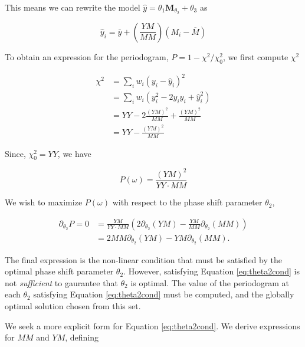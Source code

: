 \documentclass[apj]{emulateapj}
\newcommand{\Mshft}{\mathbf{M}_{\theta_2}}
\newcommand{\Mbar}{\overline{M}}
\begin{document}
This means we can rewrite the model $\hat{y} = \theta_1\Mshft + \theta_3$ as 

\begin{equation}
\hat{y}_i = \bar{y} + \left(\frac{YM}{MM}\right)(M_i - \Mbar)
\end{equation}

To obtain an expression for the periodogram, $P = 1 - \chi^2 / \chi^2_0$, we first compute $\chi^2$

\begin{align}
\chi^2 &= \sum_i w_i (y_i - \hat{y}_i)^2 \\
       &= \sum_i w_i (y_i^2 - 2y_i\hat{y}_i + \hat{y}_i^2)\\
       &= YY - 2\frac{(YM)^2}{MM} + \frac{(YM)^2}{MM}\\
       &= YY - \frac{(YM)^2}{MM}
\end{align}

Since, $\chi^2_0 = YY$, we have

\begin{equation}
P(\omega) = \frac{(YM)^2}{YY\cdot MM}
\end{equation}

We wish to maximize $P(\omega)$ with respect to the phase shift parameter $\theta_2$,

\begin{align}
\label{eq:theta2cond}
\partial_{\theta_2}P = 0 &= \frac{YM}{YY\cdot MM}\left(2\partial_{\theta_2}(YM) - \frac{YM}{MM}\partial_{\theta_2}(MM)\right)\\
                         &= 2MM\partial_{\theta_2}(YM) - YM\partial_{\theta_2}(MM).
\end{align}

The final expression is the non-linear condition that must be satisfied by the optimal
phase shift parameter $\theta_2$. However, satisfying Equation \ref{eq:theta2cond}
is not \emph{sufficient} to gaurantee that $\theta_2$ is optimal. The value of the
periodogram at each $\theta_2$ satisfying Equation \ref{eq:theta2cond} must be computed,
and the globally optimal solution chosen from this set.

We seek a more explicit form for Equation \ref{eq:theta2cond}. We
derive expressions for $MM$ and $YM$, defining
\end{document}

